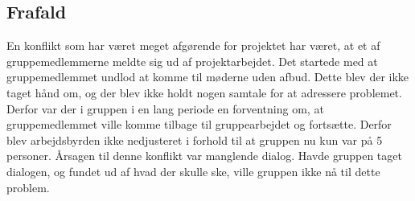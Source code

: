 \subsection{Frafald}
En konflikt som har været meget afgørende for projektet har været, at et af gruppemedlemmerne meldte sig ud af projektarbejdet. Det startede med at gruppemedlemmet undlod at komme til møderne uden afbud. Dette blev der ikke taget hånd om, og der blev ikke holdt nogen samtale for at adressere problemet. Derfor var der i gruppen i en lang periode en forventning om, at gruppemedlemmet ville komme tilbage til gruppearbejdet og fortsætte. Derfor blev arbejdsbyrden ikke nedjusteret i forhold til at gruppen nu kun var på 5 personer. Årsagen til denne konflikt var manglende dialog. Havde gruppen taget dialogen, og fundet ud af hvad der skulle ske, ville gruppen ikke nå til dette problem.
